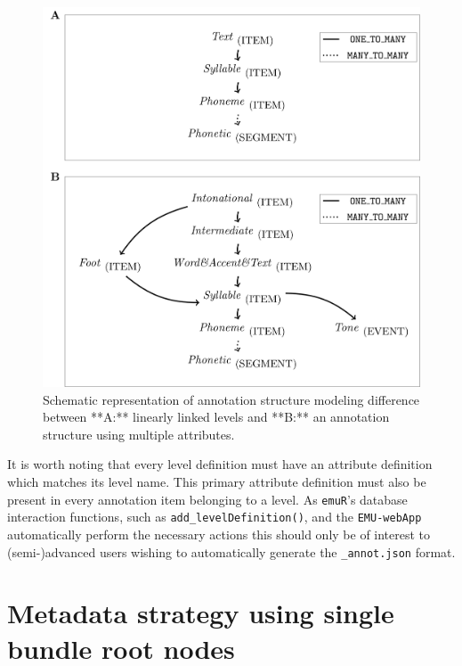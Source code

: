 \documentclass[]{book}
\theoremstyle{definition}
\theoremstyle{definition}
\theoremstyle{definition}
\theoremstyle{remark}
\begin{document}
\begin{figure}

{\centering \includegraphics[width=0.75\linewidth]{pics/annotStruct} 

}

\caption{Schematic representation of annotation structure modeling difference between **A:** linearly linked levels and **B:** an annotation structure using multiple attributes.}\label{fig:paraLabels}
\end{figure}

It is worth noting that every level definition must have an attribute
definition which matches its level name. This primary attribute
definition must also be present in every annotation item belonging to a
level. As \texttt{emuR}'s database interaction functions, such as
\texttt{add\_levelDefinition()}, and the \texttt{EMU-webApp}
automatically perform the necessary actions this should only be of
interest to (semi-)advanced users wishing to automatically generate the
\texttt{\_annot.json} format.

\hypertarget{metadata-strategy-using-single-bundle-root-nodes}{%
\section{Metadata strategy using single bundle root
nodes}\label{metadata-strategy-using-single-bundle-root-nodes}}
\end{document}
